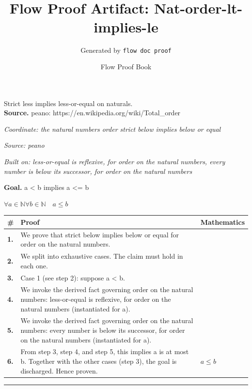\documentclass[11pt]{article}
\title{Flow Proof Artifact: Nat-order-lt-implies-le}
\author{Generated by \texttt{flow doc proof}}
\date{Flow Proof Book}
\theoremstyle{definition}
\begin{document}
\maketitle
Strict less implies less-or-equal on naturals.\\[0.5em]
\textbf{Source.} peano: https://en.wikipedia.org/wiki/Total\_order\\[0.5em]
\bigskip
{}\par
\smallskip\noindent\textit{Coordinate: the natural numbers \cdot order \cdot strict below implies below or equal}\par
\smallskip\noindent\textit{Source: peano}\par
\smallskip\noindent\textit{Built on: less-or-equal is reflexive, for order on the natural numbers, every number is below its successor, for order on the natural numbers}\par
\medskip
\noindent\textbf{Goal.} a < b implies a <= b\par
\noindent$\displaystyle \forall a \in \mathbb{N} \forall b \in \mathbb{N}\quad a \le b$\par
\medskip
\noindent
\begin{tabular}{@{} >{\raggedright\arraybackslash}p{} >{\raggedright\arraybackslash}p{} >{\raggedleft\arraybackslash}p{} @{}}
\textbf{\#} & \textbf{Proof} & \textbf{Mathematics} \\
\midrule
\textbf{1.} & We prove that strict below implies below or equal for order on the natural numbers. & \\[0.45em]
\textbf{2.} & We split into exhaustive cases. The claim must hold in each one. & \\[0.45em]
\textbf{3.} & Case 1 (see step 2): suppose a < b. & \\[0.45em]
\textbf{4.} & We invoke the derived fact governing order on the natural numbers: less-or-equal is reflexive, for order on the natural numbers (instantiated for a). & \\[0.45em]
\textbf{5.} & We invoke the derived fact governing order on the natural numbers: every number is below its successor, for order on the natural numbers (instantiated for a). & \\[0.45em]
\textbf{6.} & From step 3, step 4, and step 5, this implies a is at most b. Together with the other cases (step 3), the goal is discharged. Hence proven. & $\displaystyle a \le b$ \\[0.45em]
\bottomrule
\end{tabular}
\label{thm:Nat-order-strict_below_implies_below_or_equal}
\par\medskip\hrule
\end{document}
